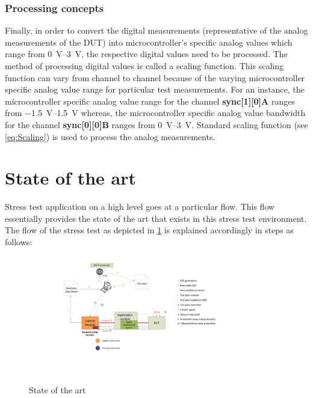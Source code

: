 \subsubsection{Processing concepts}\label{sec:Pc}
Finally, in order to convert the digital measurements (representative of the analog measurements of the \acrshort{DUT}) into microcontroller's specific analog values which range from \SIrange{0}{3}{\volt}, the respective digital values need to be processed.
The method of processing digital values is called a scaling function. This scaling function can vary from channel to channel because of the varying microcontroller specific analog value range for particular test measurements. 
For an instance, the microcontroller specific analog value range for the channel \textbf{sync[1][0]A} ranges from \SIrange{-1.5}{+1.5}{\volt} whereas, the microcontroller specific analog value bandwidth for the channel \textbf{sync[0][0]B} ranges from \SIrange{0}{3}{\volt}. 
Standard scaling function (see \cref{eq:Scaling}) is used to process the analog measurements.  

\section{State of the art}\label{sec:SOA}
Stress test application on a high level goes at a particular flow. 
This flow essentially provides the state of the art that exists in this stress test environment.
The flow of the stress test as depicted in \cref{fig:SOA} is explained accordingly in steps as follows:   

\begin{figure}[htb]
		\centering
		\includegraphics[trim=150 300 750 0, clip, width=\textwidth, scale=0.75]{images/Software_architecture.pdf}
		\caption{State of the art}
		\label{fig:SOA}
\end{figure}

